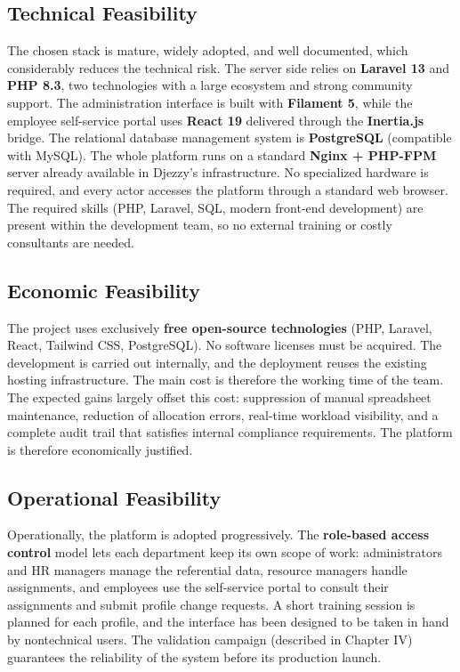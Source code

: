 \documentclass{bts-report}
\begin{document}
\subsection{Technical Feasibility}
The chosen stack is mature, widely adopted, and well documented, which considerably reduces the technical risk. The server side relies on \textbf{Laravel 13} and \textbf{PHP 8.3}, two technologies with a large ecosystem and strong community support. The administration interface is built with \textbf{Filament 5}, while the employee self-service portal uses \textbf{React 19} delivered through the \textbf{Inertia.js} bridge. The relational database management system is \textbf{PostgreSQL} (compatible with MySQL). The whole platform runs on a standard \textbf{Nginx + PHP-FPM} server already available in Djezzy's infrastructure. No specialized hardware is required, and every actor accesses the platform through a standard web browser. The required skills (PHP, Laravel, SQL, modern front-end development) are present within the development team, so no external training or costly consultants are needed.

\subsection{Economic Feasibility}
The project uses exclusively \textbf{free open-source technologies} (PHP, Laravel, React, Tailwind CSS, PostgreSQL). No software licenses must be acquired. The development is carried out internally, and the deployment reuses the existing hosting infrastructure. The main cost is therefore the working time of the team. The expected gains largely offset this cost: suppression of manual spreadsheet maintenance, reduction of allocation errors, real-time workload visibility, and a complete audit trail that satisfies internal compliance requirements. The platform is therefore economically justified.

\subsection{Operational Feasibility}
Operationally, the platform is adopted progressively. The \textbf{role-based access control} model lets each department keep its own scope of work: administrators and HR managers manage the referential data, resource managers handle assignments, and employees use the self-service portal to consult their assignments and submit profile change requests. A short training session is planned for each profile, and the interface has been designed to be taken in hand by nontechnical users. The validation campaign (described in Chapter IV) guarantees the reliability of the system before its production launch.
\end{document}
